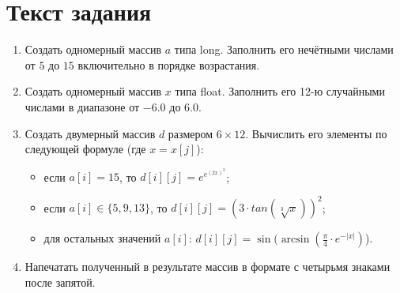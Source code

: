 \section{Текст задания}
\begin{enumerate}
\item Создать одномерный массив $a$ типа long. Заполнить его нечётными числами от $5$ до $15$ включительно в порядке возрастания.
\item Создать одномерный массив $x$ типа float. Заполнить его 12-ю случайными числами в диапазоне от $-6.0$ до $6.0$.
\item Создать двумерный массив $d$ размером $6 \times 12 $. Вычислить его элементы по следующей формуле (где $x = x[j]$):
\begin{itemize}
\item если $a[i] = 15$, то $d[i][j]=e^{e^{(2x)^3}}$;
\item если $a[i] \in \{5, 9, 13\}$, то $d[i][j]={(3 \cdot tan(\sqrt[3]{x}))}^2$;
\item для остальных значений $a[i]$: $d[i][j]=\sin(\arcsin(\frac{\pi}{4}\cdot e^{- | x |})$).
\end{itemize}
\item Напечатать полученный в результате массив в формате с четырьмя знаками после запятой.
\end{enumerate}